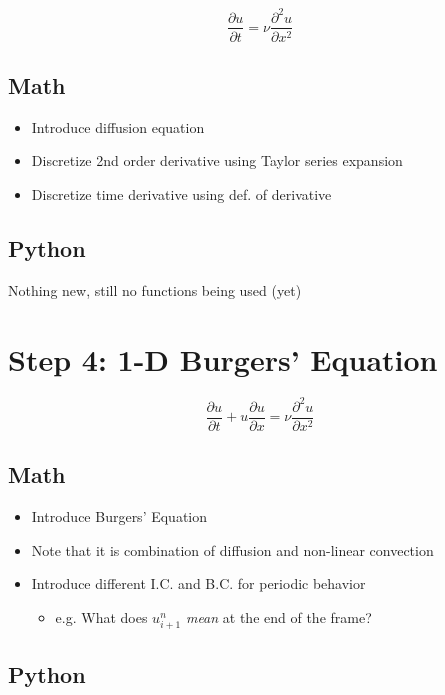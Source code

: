 \documentclass[10pt,a4paper]{report}
\begin{document}
\begin{equation}
\frac{\partial u}{\partial t} = \nu \frac{\partial ^2 u}{\partial x^2}
\end{equation}

\subsection*{Math}

\begin{itemize}
\item[] Introduce diffusion equation
\item[] Discretize 2nd order derivative using Taylor series expansion
\item[] Discretize time derivative using def. of derivative
\end{itemize}

\subsection*{Python}

Nothing new, still no functions being used (yet)

\section*{Step 4: 1-D Burgers' Equation}

\begin{equation}
\frac{\partial u}{\partial t} + u \frac{\partial u}{\partial x} = \nu \frac{\partial ^2 u}{\partial x^2}
\end{equation}

\subsection*{Math}

\begin{itemize}
\item[] Introduce Burgers' Equation
\item[] Note that it is combination of diffusion and non-linear convection
\item[] Introduce different I.C. and B.C. for periodic behavior
\begin{itemize}
\item[] e.g. What does $u^{n}_{i+1}$ \textit{mean} at the end of the frame?
\end{itemize}
\end{itemize}

\subsection*{Python}
\end{document}
